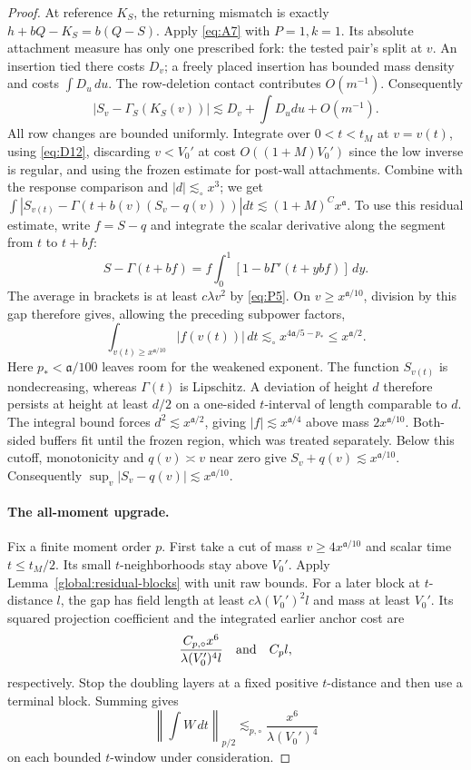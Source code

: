 \begin{proof}
At reference $K_S$, the returning mismatch is exactly
$h+bQ-K_S=b(Q-S)$.  Apply \eqref{eq:A7} with $P=1,k=1$.
Its absolute attachment measure has only one prescribed fork: the
tested pair's split at $v$.  An insertion tied there costs $D_v$;
a freely placed insertion has bounded mass density and costs
$\int D_u\,du$.  The row-deletion contact contributes $O(m^{-1})$.
Consequently
\begin{equation*}
|S_v-\Gamma_S(K_S(v))|\lesssim D_v+\int D_u du+O(m^{-1}).
\end{equation*}
All row changes are bounded uniformly. Integrate over \(0<t<t_M\) at \(v=v(t)\), using \eqref{eq:D12}, discarding \(v<V_0'\) at cost \(O((1+M)V_0')\) since the low inverse is regular, and using the frozen estimate for post-wall attachments. Combine with the response comparison and \(|d|\lesssim_\circ x^3\); we get \(\int |S_{v(t)}-\Gamma(t+b(v)(S_v-q(v)))|dt\lesssim(1+M)^C x^{\mathfrak a}\). To use this residual estimate, write $f=S-q$ and integrate the
scalar derivative along the segment from $t$ to $t+bf$:
\[
 S-\Gamma(t+bf)
 =f\int_0^1[1-b\Gamma'(t+ybf)]\,dy.
\]
The average in brackets is at least $c\lambda v^2$ by
\eqref{eq:P5}.  On $v\ge x^{\mathfrak a/10}$, division by this gap
therefore gives, allowing the preceding subpower factors,
\begin{equation*}
 \int_{v(t)\ge x^{\mathfrak a/10}}|f(v(t))|\,dt
 \lesssim_\circ x^{4\mathfrak a/5-p_*}
 \le x^{\mathfrak a/2}.
\end{equation*}
Here $p_*<\mathfrak a/100$ leaves room for the weakened exponent.
The function $S_{v(t)}$ is nondecreasing, whereas $\Gamma(t)$ is
Lipschitz.  A deviation of height $d$ therefore persists at height at
least $d/2$ on a one-sided $t$-interval of length comparable to $d$.
The integral bound forces $d^2\lesssim x^{\mathfrak a/2}$, giving
$|f|\lesssim x^{\mathfrak a/4}$ above mass
$2x^{\mathfrak a/10}$.  Both-sided buffers fit until the frozen
region, which was treated separately.  Below this cutoff,
monotonicity and $q(v)\asymp v$ near zero give
$S_v+q(v)\lesssim x^{\mathfrak a/10}$.  Consequently
$\sup_v|S_v-q(v)|\lesssim x^{\mathfrak a/10}$.

\paragraph{The all-moment upgrade.}
Fix a finite moment order $p$.  First take a cut of mass
$v\ge4x^{\mathfrak a/10}$ and scalar time $t\le t_M/2$.
Its small $t$-neighborhoods stay above $V_0'$.  Apply Lemma~\ref{global:residual-blocks} with unit raw bounds.
For a later block at $t$-distance $l$, the gap has field length at
least $c\lambda(V_0')^2l$ and mass at least $V_0'$.  Its squared
projection coefficient and the integrated earlier anchor cost are
\[
 \frac{C_{p,\circ}x^6}{\lambda(V_0')^4l}
       \quad\hbox{and}\quad C_pl,
\]
respectively.  Stop the doubling layers at a fixed positive
$t$-distance and then use a terminal block.  Summing gives
\begin{equation*}
 \left\|\int W\,dt\right\|_{p/2}
       \lesssim_{p,\circ}\frac{x^6}{\lambda(V_0')^4}
\end{equation*}
on each bounded $t$-window under consideration.


\end{proof}
